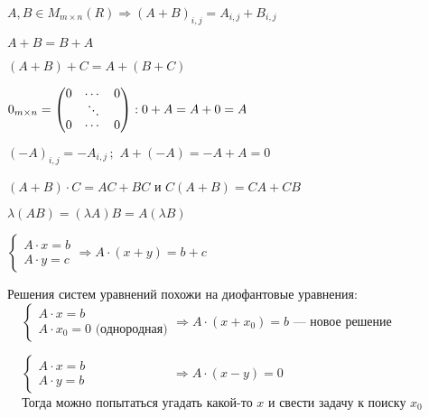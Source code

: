 \quad

\begin{definition}
    $A,B\in M_{m \times n}(R) \Longrightarrow (A+B)_{i,j} = A_{i,j}+B_{i,j}$
\end{definition}

\quad

\begin{properties} 
    \item $A+B = B+A$ 
    \item $(A + B) + C = A + (B + C)$
    \item $0_{m \times n} = \begin{pmatrix}
        0&\cdots&0\\
        &\rotatebox{135}{$\cdots$}\\
        0&\cdots&0
    \end{pmatrix} : 0 + A = A + 0 = A$ 
    \item $(-A)_{i,j} = -A_{i, j}\,;\,\, A + (-A) = -A + A = 0$
    \item $(A + B) \cdot C = A C + B C$ и $C ( A + B) = CA + CB$
\end{properties}

\quad

\begin{remark}
    $\lambda (A B) = (\lambda A)B = A (\lambda B)$
\end{remark}

\quad

\begin{remark}
    $
\begin{cases}
    A \cdot x = b \\
    A \cdot y = c
\end{cases} \Longrightarrow A \cdot (x + y) = b + c
$
\end{remark}

\newpage 
\begin{remark} Решения систем уравнений похожи на диофантовые уравнения:\\

\quad\quad\quad\quad\quad\,\,\,\,\,    $
\begin{cases}
    A \cdot x = b \\
    A \cdot x_0 = 0 \text{ (однородная)}
\end{cases} \Longrightarrow A \cdot (x + x_0) = b
$     --- новое решение

\quad\quad\quad\quad\quad\,\,\,\,\,
$
\begin{cases}
    A \cdot x = b \\
    A \cdot y = b 
\end{cases} \quad \quad\quad\quad\quad\quad\,\,\, \Longrightarrow A \cdot (x - y) = 0
$     
\\

\quad\quad\quad\quad\quad\,\,\,\,\, Тогда можно попытаться угадать какой-то $x$ и свести задачу к поиску $x_0$
\end{remark}


